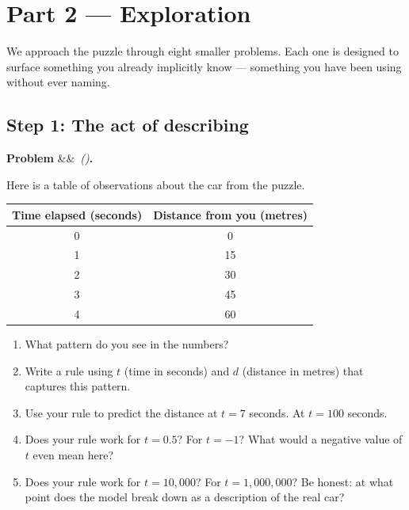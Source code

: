 \documentclass[12pt, a4paper]{article}
\newcounter{problem}
\newenvironment{problem}[1][]{%
  \refstepcounter{problem}%
  \par\vspace{6pt}%
  \noindent\textbf{\color{MidBlue}Problem \theproblem}%
  \ifx&#1&\else\ \textit{(#1)}\fi\textbf{.}\enskip
}{\par\vspace{4pt}}
\begin{document}
\section{Part 2 \texorpdfstring{---}{--} Exploration}

We approach the puzzle through eight smaller problems. Each one is designed to surface something you already implicitly know --- something you have been using without ever naming.

\subsection{Step 1: The act of describing}

\begin{problem}
\label{prob:car}
Here is a table of observations about the car from the puzzle.

\begin{center}
\begin{tabular}{cc}
\toprule
\textbf{Time elapsed (seconds)} & \textbf{Distance from you (metres)} \\
\midrule
0 & 0 \\
1 & 15 \\
2 & 30 \\
3 & 45 \\
4 & 60 \\
\bottomrule
\end{tabular}
\end{center}

\begin{enumerate}[label=(\alph*), topsep=2pt]
  \item What pattern do you see in the numbers?
  \item Write a rule using $t$ (time in seconds) and $d$ (distance in metres) that captures this pattern.
  \item Use your rule to predict the distance at $t = 7$ seconds. At $t = 100$ seconds.
  \item Does your rule work for $t = 0.5$? For $t = -1$? What would a negative value of $t$ even mean here?
  \item Does your rule work for $t = 10{,}000$? For $t = 1{,}000{,}000$? Be honest: at what point does the model break down as a description of the real car?
\end{enumerate}
\end{problem}
\end{document}
